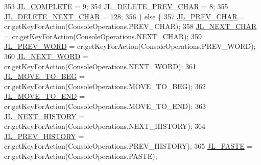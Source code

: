 \begin{DoxyCode}
353         \hyperlink{classgov_1_1nasa_1_1jpf_1_1inspector_1_1frontends_1_1jpfshell_1_1gui_1_1_swing_terminal_1_1_console_key_listener_a9b960c4fda1d967fa3b47c185cb4b7cb}{JL\_COMPLETE} = 9;
354         \hyperlink{classgov_1_1nasa_1_1jpf_1_1inspector_1_1frontends_1_1jpfshell_1_1gui_1_1_swing_terminal_1_1_console_key_listener_ac8484b1c694ec1cd32e3e761a8cc1b20}{JL\_DELETE\_PREV\_CHAR} = 8;
355         \hyperlink{classgov_1_1nasa_1_1jpf_1_1inspector_1_1frontends_1_1jpfshell_1_1gui_1_1_swing_terminal_1_1_console_key_listener_acfbea41dbd4f4a71882a22522de6afbf}{JL\_DELETE\_NEXT\_CHAR} = 128;
356       \} \textcolor{keywordflow}{else} \{
357         \hyperlink{classgov_1_1nasa_1_1jpf_1_1inspector_1_1frontends_1_1jpfshell_1_1gui_1_1_swing_terminal_1_1_console_key_listener_a76ab50ca5262254cd0d30f94c09182b0}{JL\_PREV\_CHAR} = cr.getKeyForAction(ConsoleOperations.PREV\_CHAR);
358         \hyperlink{classgov_1_1nasa_1_1jpf_1_1inspector_1_1frontends_1_1jpfshell_1_1gui_1_1_swing_terminal_1_1_console_key_listener_a44f4d9e556c9755ef6ae1acdac032e57}{JL\_NEXT\_CHAR} = cr.getKeyForAction(ConsoleOperations.NEXT\_CHAR);
359         \hyperlink{classgov_1_1nasa_1_1jpf_1_1inspector_1_1frontends_1_1jpfshell_1_1gui_1_1_swing_terminal_1_1_console_key_listener_a786dbd90033e6de1575d81bca7e5e030}{JL\_PREV\_WORD} = cr.getKeyForAction(ConsoleOperations.PREV\_WORD);
360         \hyperlink{classgov_1_1nasa_1_1jpf_1_1inspector_1_1frontends_1_1jpfshell_1_1gui_1_1_swing_terminal_1_1_console_key_listener_af77e76c0c8131f97bb0792057677a8ff}{JL\_NEXT\_WORD} = cr.getKeyForAction(ConsoleOperations.NEXT\_WORD);
361         \hyperlink{classgov_1_1nasa_1_1jpf_1_1inspector_1_1frontends_1_1jpfshell_1_1gui_1_1_swing_terminal_1_1_console_key_listener_ab88f21e9ba0483b37197984b4be3ac1c}{JL\_MOVE\_TO\_BEG} = cr.getKeyForAction(ConsoleOperations.MOVE\_TO\_BEG);
362         \hyperlink{classgov_1_1nasa_1_1jpf_1_1inspector_1_1frontends_1_1jpfshell_1_1gui_1_1_swing_terminal_1_1_console_key_listener_a7414f2d8de5af56765142ce28251c3d3}{JL\_MOVE\_TO\_END} = cr.getKeyForAction(ConsoleOperations.MOVE\_TO\_END);
363         \hyperlink{classgov_1_1nasa_1_1jpf_1_1inspector_1_1frontends_1_1jpfshell_1_1gui_1_1_swing_terminal_1_1_console_key_listener_a40e3337f6e013ee7ff2c01ba76e72cc3}{JL\_NEXT\_HISTORY} = cr.getKeyForAction(ConsoleOperations.NEXT\_HISTORY);
364         \hyperlink{classgov_1_1nasa_1_1jpf_1_1inspector_1_1frontends_1_1jpfshell_1_1gui_1_1_swing_terminal_1_1_console_key_listener_a6c5edcca29a238f7506da532be6abd67}{JL\_PREV\_HISTORY} = cr.getKeyForAction(ConsoleOperations.PREV\_HISTORY);
365         \hyperlink{classgov_1_1nasa_1_1jpf_1_1inspector_1_1frontends_1_1jpfshell_1_1gui_1_1_swing_terminal_1_1_console_key_listener_a387add499ac1fff3098d155d351eb293}{JL\_PASTE} = cr.getKeyForAction(ConsoleOperations.PASTE);

\end{DoxyCode}
